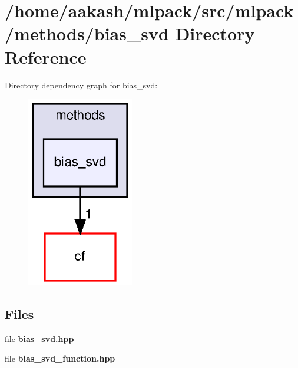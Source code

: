 \section{/home/aakash/mlpack/src/mlpack/methods/bias\+\_\+svd Directory Reference}
\label{dir_7885d606d8b1a0dffd0803506714ca0e}
Directory dependency graph for bias\+\_\+svd\+:
\nopagebreak
\begin{figure}[H]
\begin{center}
\leavevmode
\includegraphics[width=132pt]{dir_7885d606d8b1a0dffd0803506714ca0e_dep}
\end{center}
\end{figure}
\subsection*{Files}
\begin{DoxyCompactItemize}
\item 
file \textbf{ bias\+\_\+svd.\+hpp}
\item 
file \textbf{ bias\+\_\+svd\+\_\+function.\+hpp}
\end{DoxyCompactItemize}
